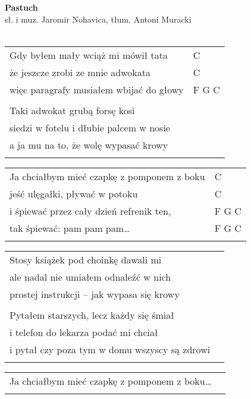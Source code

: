 \documentclass[a5paper]{article}
\begin{document}


\noindent
\fontsize{12pt}{15pt}\selectfont
\textbf{Pastuch} \\
\fontsize{8pt}{10pt}\selectfont
sł. i muz. Jaromir Nohavica, tłum. Antoni Muracki \\ \\
\fontsize{10pt}{12pt}\selectfont
{}
\begin{tabular}{@{}p{7.50cm}p{3cm}@{}}
\noindent
Gdy byłem mały wciąż mi mówił tata & C \\
że jeszcze zrobi ze mnie adwokata & C \\
więc paragrafy musiałem wbijać do głowy & F G C \\ \\

Taki adwokat grubą forsę kosi \\
siedzi w fotelu i dłubie palcem w nosie \\
a ja mu na to, że wolę wypasać krowy \\ \\
\end{tabular}

\noindent
\begin{tabular}{@{}p{10.50cm}p{3cm}@{}}
Ja chciałbym mieć czapkę z pomponem z boku & C \\
jeść ulęgałki, pływać w potoku & C \\
i śpiewać przez cały dzień refrenik ten, & F G C \\
tak śpiewać: pam pam pam… & F G C \\ \\
\end{tabular}

\noindent
\begin{tabular}{@{}p{10.50cm}p{3cm}@{}}
Stosy książek pod choinkę dawali mi \\
ale nadal nie umiałem odnaleźć w nich \\
prostej instrukcji – jak wypasa się krowy \\ \\

Pytałem starszych, lecz każdy się śmiał \\
i telefon do lekarza podać mi chciał \\
i pytał czy poza tym w domu wszyscy są zdrowi \\ \\
\end{tabular}

\noindent
\begin{tabular}{@{}p{10.50cm}p{3cm}@{}}
Ja chciałbym mieć czapkę z pomponem z boku… \\ \\
\end{tabular}
\end{document}
